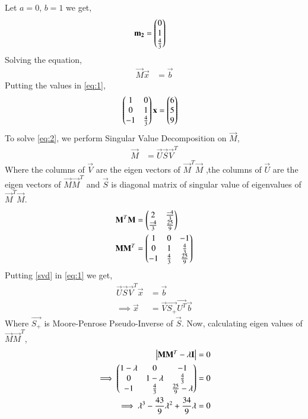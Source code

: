 \documentclass[journal,12pt,twocolumn]{IEEEtran}
\begin{document}
Let $a=0$, $b=1$ we get, 
\begin{align}
    \mathbf{m_2}&=\begin{pmatrix}0 \\ 1 \\ \frac{4}{3}\end{pmatrix}
\end{align}
Solving the equation, 
\begin{align} \label{eq:1}
    \vec{M}\vec{x}&=\vec{b}
\end{align}
Putting the values in \eqref{eq:1}, 
\begin{align} \label{eq:2}
    \begin{pmatrix}1&0\\0&1\\-1&\frac{4}{3}\end{pmatrix}\mathbf{x}&= \begin{pmatrix}6\\5\\9\end{pmatrix}
\end{align}
To solve \eqref{eq:2}, we perform Singular Value Decomposition on $\vec{M}$, 
\begin{align} \label{svd}
    \vec{M}&=\vec{U}\vec{S}\vec{V}^T
\end{align}
Where the columns of $\vec{V}$ are the eigen vectors of $\vec{M}^T\vec{M}$ ,the columns of $\vec{U}$ are the eigen vectors of $\vec{M}\vec{M}^T$ and $\vec{S}$ is diagonal matrix of singular value of eigenvalues of $\vec{M}^T\vec{M}$.
\begin{align}
    \mathbf{M}^T\mathbf{M}&=\begin{pmatrix}2&\frac{-4}{3}\\ \frac{-4}{3}& \frac{25}{9}\end{pmatrix} \label{MTM}\\
    \mathbf{M}\mathbf{M}^T&=\begin{pmatrix}1&0&-1\\0&1&\frac{4}{3}\\-1&\frac{4}{3}&\frac{25}{9}\end{pmatrix} \label{MMT}
\end{align}
Putting \eqref{svd} in \eqref{eq:1} we get, 
\begin{align}
    \vec{U}\vec{S}\vec{V}^T\vec{x}&= \vec{b}\\
    \implies\vec{x} &= \vec{V}\vec{S_+}\vec{U^T}\vec{b}\label{eq:X}
\end{align}
Where $\vec{S_+}$ is Moore-Penrose Pseudo-Inverse of $\vec{S}$. Now, calculating eigen values of $\vec{M}\vec{M}^T$,
\begin{align}
\begin{vmatrix}\mathbf{M}\mathbf{M}^T - \lambda\mathbf{I}\end{vmatrix} &= 0\\
\implies\begin{pmatrix}1-\lambda&0&-1\\0&1-\lambda&\frac{4}{3}\\-1&\frac{4}{3}&\frac{25}{9}-\lambda\end{pmatrix} &=0\\
\implies\lambda^3-\frac{43}{9}\lambda^2+\frac{34}{9}\lambda &=0
\end{align}
\end{document}
